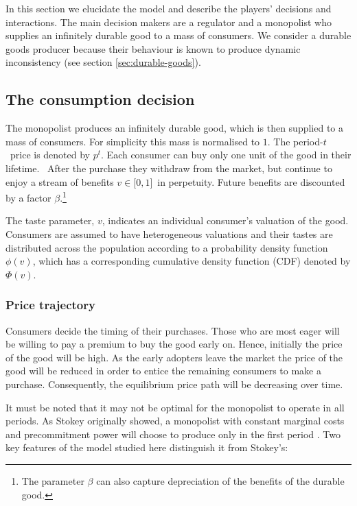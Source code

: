 In this section we elucidate the model and describe the players' decisions
and interactions. The main decision makers are a regulator and a monopolist
who supplies an infinitely durable good to a mass of consumers. We consider
a durable goods producer because their behaviour is known to produce dynamic
inconsistency (see section \ref{sec:durable-goods}).

\subsection{The consumption decision}

\label{sec:consumption-decision}

The monopolist produces an infinitely durable good, which is then supplied
to a mass of consumers. For simplicity this mass is normalised to $1$. The
period-$t$\ price is denoted by $p^{t}$. Each consumer can buy only one unit
of the good in their lifetime. \ After the purchase they withdraw from the
market, but continue to enjoy a stream of benefits $v\in \lbrack 0,1]$\ in
perpetuity. Future benefits are discounted by a factor $\beta $.\footnote{%
The parameter $\beta $  can also capture depreciation of the benefits of the
durable good.}

The taste parameter, $v$, indicates an individual consumer's valuation of
the good. Consumers are assumed to have heterogeneous valuations and their
tastes are distributed across the population according to a probability
density function $\phi (v)$, which has a corresponding cumulative density
function (CDF) denoted by $\Phi (v)$.

\subsubsection{Price trajectory}

\label{sec:price-trajectory}

Consumers decide the timing of their purchases. Those who are most eager
will be willing to pay a premium to buy the good early on. Hence, initially
the price of the good will be high. As the early adopters leave the market
the price of the good will be reduced in order to entice the remaining
consumers to make a purchase. Consequently, the equilibrium price path will
be decreasing over time.

It must be noted that it may not be optimal for the monopolist to operate in
all periods. As Stokey originally showed, a monopolist with constant
marginal costs and precommitment power will choose to produce only in the
first period \citep{Coase1972, Stokey1981}. Two key features of the model
studied here distinguish it from Stokey's:

